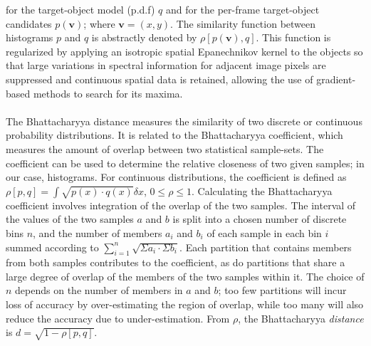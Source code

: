\documentclass[a4paper,11pt]{article}
\newcommand{\tbf}{\textbf}
\begin{document}
		for the target-object model (p.d.f) $q$ and for the per-frame target-object
		candidates $p(\tbf{v})$; where $\tbf{v} = (x, y)$. The similarity function
		between histograms $p$ and $q$ is abstractly denoted by $\rho[p(\tbf{v}), q]$.
		This function is regularized by applying an isotropic spatial Epanechnikov kernel
		to the objects so that large variations in spectral information for adjacent image
		pixels are suppressed and continuous spatial data is retained, allowing the use of
		gradient-based methods to search for its maxima.
		\\ \\
		The Bhattacharyya distance measures the similarity of two discrete or continuous
		probability distributions. It is related to the Bhattacharyya coefficient, which
		measures the amount of overlap between two statistical sample-sets. The coefficient
		can be used to determine the relative closeness of two given samples; in our case,
		histograms. For continuous distributions, the coefficient is defined as
		$\rho[p, q] = \int \sqrt{p(x) \cdot q(x) } \delta x$, $0 \leq \rho \leq 1$.
		Calculating the Bhattacharyya coefficient involves integration of the overlap
		of the two samples. The interval of the values of the two samples $a$ and $b$
		is split into a chosen number of discrete bins $n$, and the number of members
		$a_i$ and $b_i$ of each sample in each bin $i$ summed according to
		$\sum_{i=1}^{n} \sqrt{\Sigma a_i \cdot \Sigma b_i}$. Each partition that contains
		members from both samples contributes to the coefficient, as do partitions that
		share a large degree of overlap of the members of the two samples  within it. The
		choice of $n$ depends on the number of members in $a$ and $b$; too few partitions
		will incur loss of accuracy by over-estimating the region of overlap, while too many
		will also reduce the accuracy due to under-estimation. From $\rho$, the Bhattacharyya
		\textit{distance} is $d = \sqrt{1 - \rho[p, q]}$.
\end{document}
